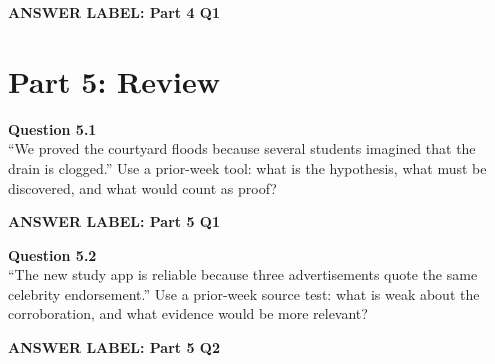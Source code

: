 \documentclass[12pt]{article}
\newcommand{\answerbox}[2]{%
\vspace{0.15em}
\noindent\textbf{#1}\par
\vspace{0.05em}
\noindent\fbox{%
\begin{minipage}[t][#2]{\dimexpr\textwidth-2\fboxsep-2\fboxrule}
\rule{\textwidth}{0pt}
\vspace{#2}
\end{minipage}
}\par
\vspace{0.25em}
}
\begin{document}
\answerbox{ANSWER LABEL: Part 4 Q1}{3.2in}

\newpage

\section*{Part 5: Review}

\textbf{Question 5.1}\\[-0.15em]
``We proved the courtyard floods because several students imagined that the drain is clogged.'' Use a prior-week tool: what is the hypothesis, what must be discovered, and what would count as proof?

\answerbox{ANSWER LABEL: Part 5 Q1}{2.2in}

\textbf{Question 5.2}\\[-0.15em]
``The new study app is reliable because three advertisements quote the same celebrity endorsement.'' Use a prior-week source test: what is weak about the corroboration, and what evidence would be more relevant?

\answerbox{ANSWER LABEL: Part 5 Q2}{2.05in}
\end{document}
